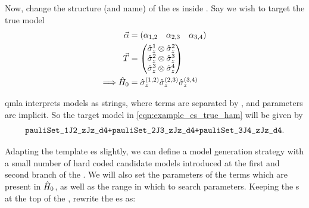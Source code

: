 Now, change the structure (and name) of the \gls{es} inside . 
Say we wish to target the true model 
\begin{equation}
    \label{eqn:example_es_true_ham}
    \begin{split}
        \vec{\alpha} &= \begin{matrix}( \alpha_{1,2} & \alpha_{2,3} & \alpha_{3,4})\end{matrix} \\
        { \vec{T} } &= \left(\begin{matrix} \hat{\sigma}_{z}^1 \otimes \hat{\sigma}_{z}^2 \\ \hat{\sigma}_{z}^2 \otimes \hat{\sigma}_{z}^3  \\ \hat{\sigma}_{z}^3 \otimes \hat{\sigma}_{z}^4 \end{matrix}\right) \\
        \Longrightarrow \hat{H}_0 &= \hat{\sigma}_{z}^{(1,2)} \hat{\sigma}_{z}^{(2,3)} \hat{\sigma}_{z}^{(3,4)} \\
    \end{split}
\end{equation}

\gls{qmla} interprets models as strings, where terms are separated by \ttt{+}, and parameters are implicit. 
So the target model in \cref{eqn:example_es_true_ham} will be given by 
$$ \texttt{pauliSet\_1J2\_zJz\_d4+pauliSet\_2J3\_zJz\_d4+pauliSet\_3J4\_zJz\_d4}. $$

Adapting the template \gls{es} slightly, we can define a model generation strategy with a small number of hard coded 
    candidate models introduced at the first and second branch of the . 
We will also set the parameters of the terms which are present in $\hat{H}_0$, as well as the range in which to search parameters.
Keeping the s at the top of the , rewrite the \gls{es} as: 

